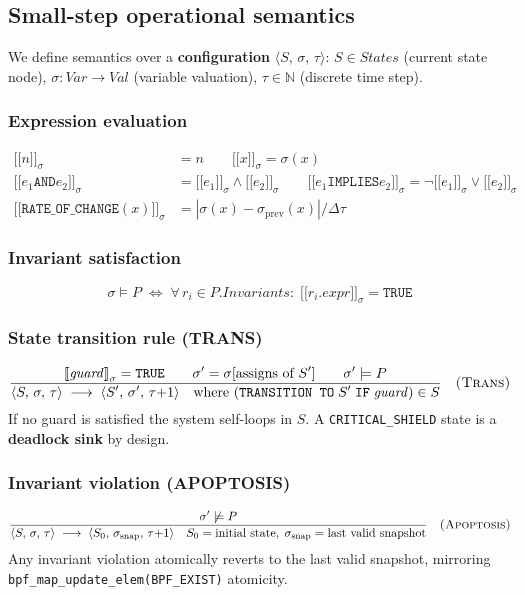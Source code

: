 \documentclass[11pt,a4paper,twoside]{article}
\newcommand{\sem}[1]{\mathopen{[\![}#1\mathclose{]\!]}}
\newcommand{\tm}[1]{\texttt{#1}}
\newcommand{\irule}[3]{\dfrac{\displaystyle #1}{\displaystyle #2}\quad\textsc{(#3)}}
\begin{document}
\subsection{Small-step operational semantics}

We define semantics over a \textbf{configuration} $\langle S,\,\sigma,\,\tau\rangle$:
$S \in \textit{States}$ (current state node),
$\sigma : \textit{Var} \to \textit{Val}$ (variable valuation),
$\tau \in \mathbb{N}$ (discrete time step).

\subsubsection{Expression evaluation}
\begin{align*}
\sem{n}_\sigma &= n \qquad \sem{x}_\sigma = \sigma(x) \\
\sem{e_1 \mathbin{\tm{AND}} e_2}_\sigma &= \sem{e_1}_\sigma \wedge \sem{e_2}_\sigma \qquad
\sem{e_1 \mathbin{\tm{IMPLIES}} e_2}_\sigma = \neg\sem{e_1}_\sigma \vee \sem{e_2}_\sigma \\
\sem{\tm{RATE\_OF\_CHANGE}(x)}_\sigma &= {|\sigma(x) - \sigma_{\mathrm{prev}}(x)|}/{\Delta\tau}
\end{align*}

\subsubsection{Invariant satisfaction}
\[
  \sigma \models P \;\iff\; \forall\, r_i \in P.\textit{Invariants}:\; \sem{r_i.\textit{expr}}_\sigma = \tm{TRUE}
\]

\subsubsection{State transition rule (TRANS)}
\[
\irule{
  \sem{\mathit{guard}}_\sigma = \tm{TRUE} \qquad
  \sigma' = \sigma[\text{assigns of }S'] \qquad
  \sigma' \models P
}{
  \langle S,\,\sigma,\,\tau\rangle \;\longrightarrow\; \langle S',\,\sigma',\,\tau{+}1\rangle
  \quad \text{where } (\tm{TRANSITION TO}\;S'\;\tm{IF}\;\mathit{guard})\in S
}{Trans}
\]
If no guard is satisfied the system self-loops in $S$.
A \tm{CRITICAL\_SHIELD} state is a \textbf{deadlock sink} by design.

\subsubsection{Invariant violation (APOPTOSIS)}
\[
\irule{
  \sigma' \not\models P
}{
  \langle S,\,\sigma,\,\tau\rangle \;\longrightarrow\;
  \langle S_0,\,\sigma_{\mathrm{snap}},\,\tau{+}1\rangle \quad
  S_0 = \text{initial state},\; \sigma_{\mathrm{snap}} = \text{last valid snapshot}
}{Apoptosis}
\]
Any invariant violation atomically reverts to the last valid snapshot,
mirroring \texttt{bpf\_map\_update\_elem(BPF\_EXIST)} atomicity.
\end{document}
